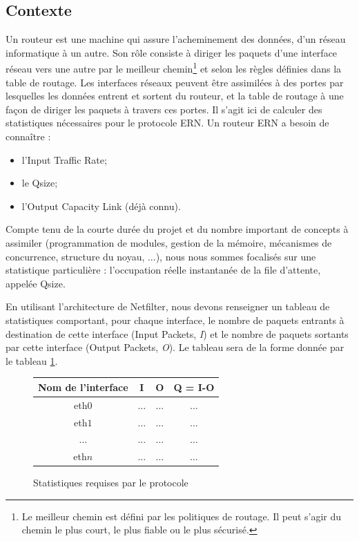 \documentclass[a4paper]{article}
\begin{document}
\subsection{Contexte}
Un routeur est une machine qui assure l’acheminement des données,
d'un réseau informatique à un autre. Son rôle consiste à diriger
les paquets d'une interface réseau vers une autre par le meilleur chemin\footnote{Le meilleur chemin est défini par
les politiques de routage. Il peut s'agir du chemin le plus court, le plus fiable ou le plus sécurisé.} et selon les règles définies dans la table de
routage. 
Les interfaces réseaux peuvent être assimilées à des
portes par lesquelles les données entrent et sortent du routeur, et
la table de routage à une façon de diriger les paquets à travers
ces portes.
Il s'agit ici de calculer des statistiques nécessaires 
pour le protocole ERN. Un routeur ERN a besoin de connaître :
\begin{itemize}
	\item l'Input Traffic Rate;
	\item le Qsize;
	\item l'Output Capacity Link (déjà connu).
\end{itemize}
Compte tenu de la courte durée du projet et 
du nombre important de concepts à assimiler (programmation de modules,
gestion de la mémoire, mécanismes de concurrence, structure du noyau, ...),
nous nous sommes focalisés sur une statistique particulière : l'occupation
réelle instantanée de la file d'attente, appelée Qsize.

En utilisant l'architecture de Netfilter, nous devons renseigner
un tableau de statistiques comportant, pour chaque interface, le
nombre de paquets entrants à destination de cette interface
(Input Packets, \textit{I}) et le nombre de paquets sortants
par cette interface (Output Packets, \textit{O}). Le tableau sera de la forme donnée par le tableau \ref{stats}.
\begin{figure}[!ht]
	\centering
	\begin{tabular}{c|c|c|c}
		Nom de l'interface & I & O & Q = I-O \\
		\hline
		eth$0$ & $\ldots$ & $\ldots$ & $\ldots$ \\
		eth$1$ & $\ldots$ & $\ldots$ & $\ldots$ \\
		$\ldots$ & $\ldots$ & $\ldots$ & $\ldots$ \\
		eth$n$ & $\ldots$ & $\ldots$ & $\ldots$ \\
	\end{tabular}
	\caption{\label{stats} Statistiques requises par le protocole}
\end{figure}
\end{document}
